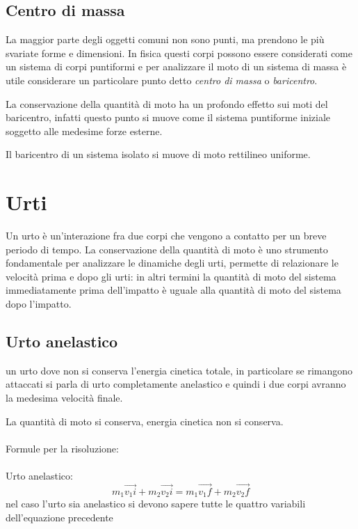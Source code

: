  \subsection{Centro di massa}
 La maggior parte degli oggetti comuni non sono punti, ma prendono le più svariate forme e dimensioni.
 In fisica questi corpi possono essere considerati come un sistema di corpi puntiformi e per analizzare il moto di un sistema di massa è utile considerare un particolare punto detto \textit{centro di massa} o \textit{baricentro}.
 
 La conservazione della quantità di moto ha un profondo effetto sui moti del baricentro, infatti questo punto si muove come il sistema puntiforme iniziale soggetto alle medesime forze esterne.
 
 Il baricentro di un sistema isolato si muove di moto rettilineo uniforme.
 
 \section{Urti}
 Un urto è un’interazione fra due corpi che vengono a contatto per un breve periodo di tempo.
 La conservazione della quantità di moto è uno strumento fondamentale per analizzare le dinamiche degli urti, permette di relazionare le velocità prima e dopo gli urti: in altri termini la quantità di moto del sistema immediatamente prima dell'impatto è uguale alla quantità di moto del sistema dopo l’impatto.
 
 \subsection{Urto anelastico}
 \e un urto dove non si conserva l’energia cinetica totale, in particolare se rimangono attaccati si parla di urto completamente anelastico e quindi i due corpi avranno la medesima velocità finale.
 
 La quantità di moto si conserva, energia cinetica non si conserva.
 
 \paragraph{}
 Formule per la risoluzione:
 \paragraph{}
 Urto anelastico:
\begin{equation}
    m_1\vec{v_1i} + m_2\vec{v_2i} = m_1\vec{v_1f} + m_2\vec{v_2f}
\end{equation}
nel caso l'urto sia anelastico si devono sapere tutte le quattro variabili dell'equazione precedente

